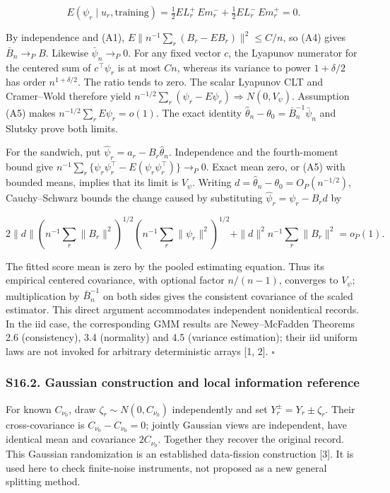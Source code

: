 \documentclass[
  american,
  11pt,
]{article}
\begin{document}
\[
E(\psi_r\mid u_r,\text{training})
=\tfrac12 E L_r^+\,E m_r^-+
\tfrac12 E L_r^-\,E m_r^+=0.
\]

By independence and (A1), \(E\|n^{-1}\sum_r(B_r-E B_r)\|^2\le C/n\), so
(A4) gives \(\bar B_n\to_P B\). Likewise \(\bar\psi_n\to_P0\). For any
fixed vector \(c\), the Lyapunov numerator for the centered sum of
\(c^\top\psi_r\) is at most \(Cn\), whereas its variance to power
\(1+\delta/2\) has order \(n^{1+\delta/2}\). The ratio tends to zero.
The scalar Lyapunov CLT and Cramer--Wold therefore yield
\(n^{-1/2}\sum_r(\psi_r-E\psi_r)\Rightarrow N(0,V_\psi)\). Assumption
(A5) makes \(n^{-1/2}\sum_rE\psi_r=o(1)\). The exact identity
\(\widehat\theta_n-\theta_0=\bar B_n^{-1}\bar\psi_n\) and Slutsky prove
both limits.

For the sandwich, put \(\widehat\psi_r=a_r-B_r\widehat\theta_n\).
Independence and the fourth-moment bound give
\(n^{-1}\sum_r\{\psi_r\psi_r^\top-E(\psi_r\psi_r^\top)\}\to_P0\). Exact
mean zero, or (A5) with bounded means, implies that its limit is
\(V_\psi\). Writing \(d=\widehat\theta_n-\theta_0=O_P(n^{-1/2})\),
Cauchy--Schwarz bounds the change caused by substituting
\(\widehat\psi_r=\psi_r-B_rd\) by

\[
2\|d\|\left(n^{-1}\sum_r\|B_r\|^2\right)^{1/2}
\left(n^{-1}\sum_r\|\psi_r\|^2\right)^{1/2}
+\|d\|^2 n^{-1}\sum_r\|B_r\|^2=o_P(1).
\]

The fitted score mean is zero by the pooled estimating equation. Thus
its empirical centered covariance, with optional factor \(n/(n-1)\),
converges to \(V_\psi\); multiplication by \(\bar B_n^{-1}\) on both
sides gives the consistent covariance of the scaled estimator. This
direct argument accommodates independent nonidentical records. In the
iid case, the corresponding GMM results are Newey--McFadden Theorems 2.6
(consistency), 3.4 (normality) and 4.5 (variance estimation); their iid
uniform laws are not invoked for arbitrary deterministic arrays {[}1,
2{]}. \(\square\)

\subsubsection{S16.2. Gaussian construction and local information
reference}\label{s16.2.-gaussian-construction-and-local-information-reference}

For known \(C_{\nu_0}\), draw \(\zeta_r\sim N(0,C_{\nu_0})\)
independently and set \(Y_r^\pm=Y_r\pm\zeta_r\). Their cross-covariance
is \(C_{\nu_0}-C_{\nu_0}=0\); jointly Gaussian views are independent,
have identical mean and covariance \(2C_{\nu_0}\). Together they recover
the original record. This Gaussian randomization is an established
data-fission construction {[}3{]}. It is used here to check finite-noise
instruments, not proposed as a new general splitting method.
\end{document}
